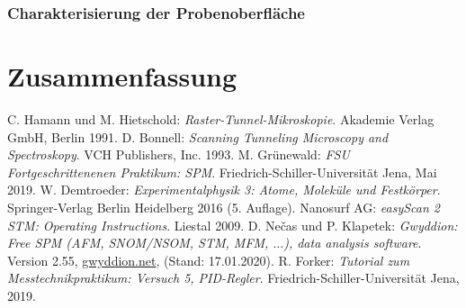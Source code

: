\documentclass[a4paper,twoside,final]{article}
\begin{document}
\subsubsection{Charakterisierung der Probenoberfläche}


\section{Zusammenfassung}

\begin{thebibliography}{xxx}
C. Hamann und M. Hietschold: \textit{Raster-Tunnel-Mikroskopie}. Akademie Verlag GmbH, Berlin 1991.
D. Bonnell: \textit{Scanning Tunneling Microscopy and Spectroskopy}. VCH Publishers, Inc. 1993.
M. Grünewald: \textit{FSU Fortgeschrittenenen Praktikum: SPM}. Fried\-rich-Schil\-ler-Uni\-versi\-tät Jena, Mai 2019.
W. Demtroeder: \textit{Experimentalphysik 3: Atome, Moleküle und Festkörper}. Springer-Verlag Berlin Heidelberg 2016 (5. Auflage).
Nanosurf AG: \textit{easyScan 2 STM: Operating Instructions}. Liestal 2009.
D. Nečas und P. Klapetek: \textit{Gwyddion: Free SPM (AFM, SNOM/NSOM, STM, MFM, $\hdots$), data analysis software}. Version 2.55, \url{gwyddion.net}, (Stand: 17.01.2020).
R. Forker: \textit{Tutorial zum Messtechnikpraktikum: Versuch 5, PID-Regler}. Fried\-rich-Schil\-ler-Uni\-versi\-tät Jena, 2019.
\end{thebibliography}
\end{document}
